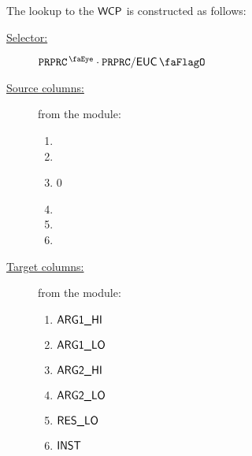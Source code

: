 The lookup to the $\textsf{WCP}$ is constructed as follows:
\begin{description}
	\item[\underline{Selector:}] $\isPreprocessing{} \cdot \ppEucFlag{}$
	\item[\underline{Source columns:}] from the \mmuMod{} module:
		\begin{multicols}{3}
			\begin{enumerate}
				\item \ppWcpArgOneHi{}
				\item \ppWcpArgOneLo{}
				\item 0
				\item \ppWcpArgTwoLo{}
				\item \ppWcpRes{}
				\item \ppWcpInst{}
			\end{enumerate}
		\end{multicols}
	\item[\underline{Target columns:}] from the \wcpMod{} module: 
		\begin{multicols}{3}
			\begin{enumerate}
				\item $\textsf{ARG}\textsf{1}\textsf{\_HI}$
				\item $\textsf{ARG}\textsf{1}\textsf{\_LO}$
				\item $\textsf{ARG}\textsf{2}\textsf{\_HI}$
				\item $\textsf{ARG}\textsf{2}\textsf{\_LO}$
				\item $\textsf{RES}\textsf{\_LO}$
				\item $\textsf{INST}$
			\end{enumerate} 
		\end{multicols}
\end{description}
